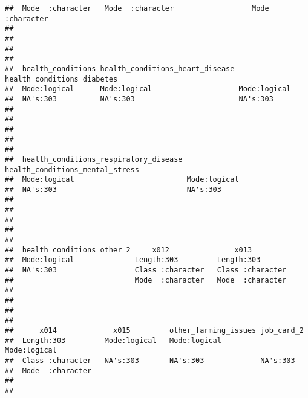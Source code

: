 \documentclass[
]{article}
\begin{document}
\begin{verbatim}
##  Mode  :character   Mode  :character                  Mode  :character  
##                                                                         
##                                                                         
##                                                                         
##                                                                         
##  health_conditions health_conditions_heart_disease health_conditions_diabetes
##  Mode:logical      Mode:logical                    Mode:logical              
##  NA's:303          NA's:303                        NA's:303                  
##                                                                              
##                                                                              
##                                                                              
##                                                                              
##                                                                              
##  health_conditions_respiratory_disease health_conditions_mental_stress
##  Mode:logical                          Mode:logical                   
##  NA's:303                              NA's:303                       
##                                                                       
##                                                                       
##                                                                       
##                                                                       
##                                                                       
##  health_conditions_other_2     x012               x013          
##  Mode:logical              Length:303         Length:303        
##  NA's:303                  Class :character   Class :character  
##                            Mode  :character   Mode  :character  
##                                                                 
##                                                                 
##                                                                 
##                                                                 
##      x014             x015         other_farming_issues job_card_2    
##  Length:303         Mode:logical   Mode:logical         Mode:logical  
##  Class :character   NA's:303       NA's:303             NA's:303      
##  Mode  :character                                                     
##                                                                       
##                                                                       

\end{verbatim}
\end{document}
